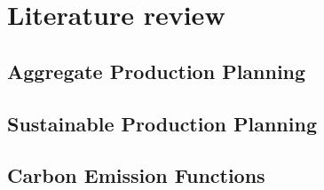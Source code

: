 \documentclass[final,3p,times,review,authoryear]{elsarticle}
\begin{document}




\section{Literature review}
\label{sec:review}

\subsection{Aggregate Production Planning}

\citet{esteso2022}
\citet{cheraghalikhani2019}
\citet{altendorfer2016}
\citet{rasmi2019}
\citet{modarres2016}
\citet{aydin2022}
\citet{bushuev2013}
\citet{tirkolaee2024}
\citet{turkay2016}
\citet{khaled2022}
\citet{entezaminia2016}
\citet{may2023}
\citet{li2013}
\citet{hahn2018}
\citet{zhang2013}
\citet{demirel2018}
\citet{jamalnia2017}



\subsection{Sustainable Production Planning} 

\citet{diaz2014}
\citet{jabbour2015}
\citet{brandenburg2015}
\citet{jabbour2018}
\citet{choudhary2015}
\citet{wang2023}
\citet{chen2014}
\citet{hu2023}
\citet{dazhi2022}
\citet{zheng2015}
\citet{cariou2019}
\citet{tang2015}
\citet{fahimnia2015}
\citet{zhao2024}
\citet{zhang2013}



\subsection{Carbon Emission Functions}
\end{document}
